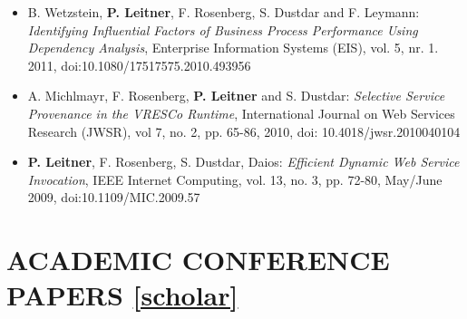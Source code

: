 \documentclass[paper=letter,fontsize=11pt]{scrartcl} %
\newcommand{\NewPart}[2]{\section*{\uppercase{#1} #2}}
\begin{document}
\begin{itemize}
{Domain-Specific Language and Execution Environment for Protocols of Stateful Web
Services}, Distributed and Parallel Databases (DPD), vol. 29, nr. 4, pp.
277-307. 2011, doi:10.1007/s10619-011-7079-6
\item B. Wetzstein, \textbf{P. Leitner}, F. Rosenberg, S. Dustdar and F. Leymann: \emph{Identifying Influential Factors of Business Process Performance Using Dependency Analysis}, Enterprise Information Systems (EIS), vol. 5, nr. 1. 2011, doi:10.1080/17517575.2010.493956
\item A. Michlmayr, F. Rosenberg, \textbf{P. Leitner} and S. Dustdar: \emph{Selective Service Provenance in the VRESCo Runtime}, International Journal on Web Services Research (JWSR), vol 7, no. 2, pp. 65-86, 2010, doi: 10.4018/jwsr.2010040104
\item \textbf{P. Leitner}, F. Rosenberg, S. Dustdar, Daios: \emph{Efficient Dynamic Web Service Invocation}, IEEE Internet Computing, vol. 13, no. 3, pp. 72-80, May/June 2009, doi:10.1109/MIC.2009.57
\end{itemize}

\NewPart{Academic Conference Papers}{\href{https://scholar.google.ch/citations?user=wZ9f8CAAAAAJ}{[scholar]}}
\end{document}
